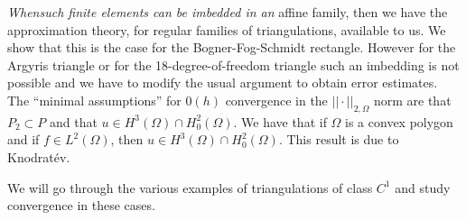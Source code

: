{\em When\pageoriginale such finite elements can be imbedded in an}
affine family, then we have the approximation theory, for regular
families of triangulations, available to us. We show that this is the
case for the Bogner-Fog-Schmidt rectangle. However for the Argyris
triangle or for the 18-degree-of-freedom triangle such an imbedding is
not possible and we have to modify the usual argument to obtain error
estimates. The ``minimal assumptions'' for $0(h)$ convergence in the
$||\cdot ||_{2,\Omega}$ norm are that $P_{2}\subset P$ and that $u\in
H^{3}(\Omega)\cap H^{2}_{0}(\Omega)$. We have that if $\Omega$ is a
convex polygon and if $f\in L^{2}(\Omega)$, then $u\in
H^{3}(\Omega)\cap H^{2}_{0}(\Omega)$. This result is due to
Knodrat\'ev. 

We will go through the various examples of triangulations of class
$C^{1}$ and study convergence in these cases.

